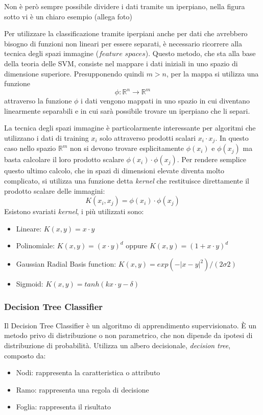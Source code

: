 \documentclass[12pt,italian]{report}
\begin{document}
Non è però sempre possibile dividere i dati tramite un iperpiano, nella figura sotto vi è un chiaro esempio  (allega foto)

Per utilizzare la classificazione tramite iperpiani anche per dati che avrebbero bisogno di funzioni non lineari per essere separati, è necessario ricorrere alla tecnica degli spazi immagine ($feature$ $spaces$). Questo metodo, che sta alla base della teoria delle SVM, consiste nel mappare i dati iniziali in uno spazio di dimensione superiore.  Presupponendo quindi $m > n$, per la mappa si utilizza una funzione
\begin{equation}
	\phi: \mathbb{R}^{n} \rightarrow \mathbb{R}^{m}
\end{equation}
attraverso la funzione $\phi$ i dati vengono mappati in uno spazio in cui diventano linearmente separabili e in cui sarà possibile trovare un iperpiano che li separi.

La tecnica degli spazi immagine è particolarmente interessante per algoritmi che utilizzano i dati di training $x_i$ solo attraverso prodotti scalari $x_i \cdot x_j$. In questo caso nello spazio $\mathbb{R}^{m}$ non si devono trovare esplicitamente $\phi(x_i)$ e $\phi (x_j)$ ma basta calcolare il loro prodotto scalare $\phi (x_i) \cdot \phi (x_j)$. Per rendere semplice questo ultimo calcolo, che in spazi di dimensioni elevate diventa molto complicato, si utilizza una funzione detta \textit{kernel} che restituisce direttamente il prodotto scalare delle immagini:
\begin{equation}
K(x_i, x_j) = \phi (x_i) \cdot \phi (x_j)
\end{equation}
Esistono svariati \textit{kernel}, i più utilizzati sono:
\begin{itemize}
	\item Lineare: $K(x, y) = x \cdot y$
	\item Polinomiale: $K(x, y) = (x \cdot y)^{d}$ oppure $K(x, y) = (1 + x \cdot y)^{d}$
	\item Gaussian Radial Basis function: $K(x,y) = exp (- \left | x-y \right |^2)/(2 \sigma 2)$
	\item Sigmoid: $K(x,y) = tanh(k x \cdot y - \delta)$ 
\end{itemize}

\subsubsection{Decision Tree Classifier}
Il Decision Tree Classifier è un algoritmo di apprendimento supervisionato. È un metodo privo di distribuzione o non parametrico, che non dipende da ipotesi di distribuzione di probabilità. Utilizza un albero decisionale, \textit{decision tree}, composto da:
\begin{itemize}
	\item Nodi: rappresenta la caratteristica o attributo
	\item Ramo: rappresenta una regola di decisione
	\item Foglia: rappresenta il risultato
\end{itemize}
\end{document}
